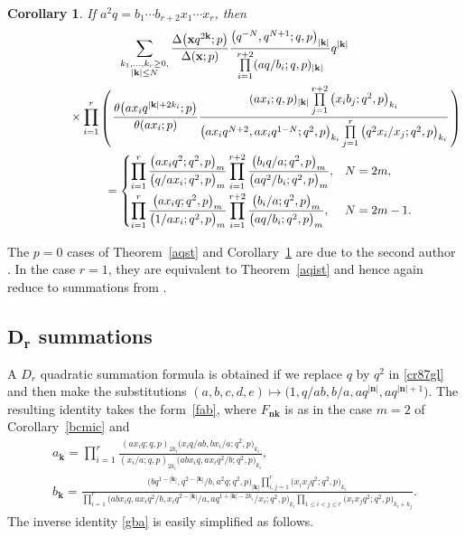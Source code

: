 \documentclass[pdftex]{sigma}%
\numberwithin{equation}{section}
\newtheorem{Corollary}[Theorem]{Corollary}
\newcommand\bn{\mathbf n}
\newcommand\bk{\mathbf k}
\newcommand\bx{\mathbf x}
\begin{document}
\begin{Corollary}\label{aqsc}
If $a^2q=b_1\dotsm b_{r+2}x_1\dotsm x_r$, then
\begin{gather*}
\sum_{\substack{k_1,\dots,k_r\geq 0,\\ |\bk|\leq N}}
\frac{\Delta\big(\bx q^{2\bk};p\big)}{\Delta(\bx;p)}
\frac{\big(q^{-N},q^{N+1};q,p\big)_{|\bk|}}{\prod\limits_{i=1}^{r+2}(aq/b_i;q,p)_{|\bk|}} q^{|\bk|}
\\ \phantom{\sum_{\substack{k_1,\dots,k_r\geq 0,\\ |\bk|\leq N}}=}{}
\times\prod\limits_{i=1}^r
\raisebox{-1pt}{$\left(\rule{0pt}{26pt}\right.$}
\frac{\theta\big(ax_iq^{|\bk|+2k_i};p\big)}{\theta(ax_i;p)}\frac{(ax_i;q,p)_{|\bk|}
\prod\limits_{j=1}^{r+2}\big(x_ib_j;q^2,p\big)_{k_i}}{\big(ax_iq^{N+2},ax_iq^{1-N};q^2,p\big)_{k_i}
\prod\limits_{j=1}^r\big(q^2x_i/x_j;q^2,p\big)_{k_i}}
\raisebox{-1pt}{$\left.\rule{0pt}{26pt}\right)$}
\\ \phantom{\sum_{\substack{k_1,\dots,k_r\geq 0,\\ |\bk|\leq N}}}{}
=\begin{cases}\displaystyle\prod\limits_{i=1}^r\frac{\big(ax_iq^2;q^2,p\big)_m}{\big(q/ax_i;q^2,p\big)_m}
\prod\limits_{i=1}^{r+2}\frac{\big(b_iq/a;q^2,p\big)_m}{\big(aq^2/b_i;q^2,p\big)_m}, & N=2m,
\\[2.5ex]
\displaystyle\prod\limits_{i=1}^r\frac{\big(ax_iq;q^2,p\big)_m}{\big(1/ax_i;q^2,p\big)_m}
\prod\limits_{i=1}^{r+2}\frac{\big(b_i/a;q^2,p\big)_m}{\big(aq/b_i;q^2,p\big)_m}, & N=2m-1.
\end{cases}
\end{gather*}
\end{Corollary}

The $p=0$ cases of Theorem~\ref{aqst} and Corollary~\ref{aqsc} are due to the second author \cite[Theorems~5.4 and~5.8]{s}. In the case $r=1$, they are equivalent to Theorem~\ref{aqist} and hence again reduce to summations from \cite{w}.

\subsection[Dr summations]{$\boldsymbol{D_r}$ summations}\label{dss}

A $D_r$ quadratic summation formula is obtained if we replace
$q$ by $q^2$ in \eqref{cr87gl} and then make the substitutions
$(a,b,c,d,e)\mapsto \big(1,q/ab,b/a,aq^{|\bn|},aq^{|\bn|+1}\big)$.
The resulting identity takes the form~\eqref{fab}, where $F_{\bn\bk}$ is as in the case $m=2$ of Corollary~\ref{bcmic} and
\begin{gather*}
a_{\bk}=\prod\limits_{i=1}^r\frac{(ax_iq;q,p)_{2k_i}\big(x_iq/ab,bx_i/a;q^2,p\big)_{k_i}}
{(x_i/a;q,p)_{2k_i}\big(abx_iq,ax_iq^2/b;q^2,p\big)_{k_i}},
\\
b_{\bk}=\frac{\big(bq^{1-|\bk|},q^{2-|\bk|}/b,a^2q;q^2,p\big)_{|\bk|}
\prod\limits_{i, j=1}^r\big(x_ix_jq^2;q^2,p\big)_{k_i}}{\prod\limits_{i=1}^r
\big(abx_iq,ax_iq^2/b,x_iq^{2-|\bk|}/a,aq^{1+|\bk|-2k_i}/x_i;q^2,p\big)_{k_i}
\prod\limits_{1\le i<j\le r}\big(x_ix_jq^2;q^2,p\big)_{k_i+k_j}}.
\end{gather*}
The inverse identity \eqref{gba} is easily simplified as follows.
\end{document}
